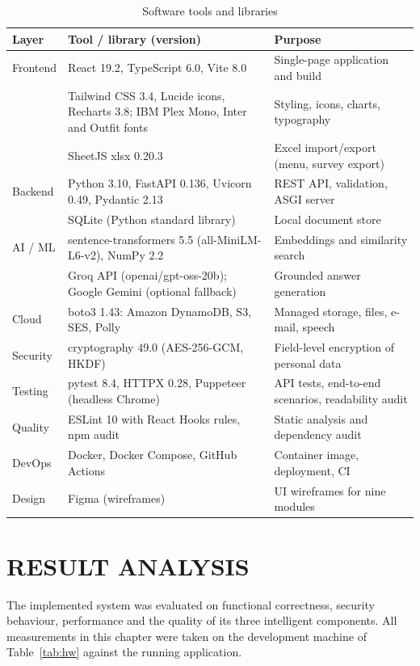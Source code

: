 \documentclass[12pt,a4paper,oneside]{report}
\newcommand{\head}{\rowcolor{headblue}}
\begin{document}
\begin{table}[!htbp]\centering\small
\caption{Software tools and libraries}\label{tab:sw}
\begin{tabularx}{\linewidth}{P{0.75in}LP{2.05in}}
\toprule\head \textbf{Layer} & \textbf{Tool / library (version)} & \textbf{Purpose}\\\midrule
Frontend & React 19.2, TypeScript 6.0, Vite 8.0 & Single-page application and build\\
  & Tailwind CSS 3.4, Lucide icons, Recharts 3.8; IBM Plex Mono, Inter and Outfit fonts & Styling, icons, charts, typography\\
 & SheetJS xlsx 0.20.3 & Excel import/export (menu, survey export)\\
Backend & Python 3.10, FastAPI 0.136, Uvicorn 0.49, Pydantic 2.13 & REST API, validation, ASGI server\\
 & SQLite (Python standard library) & Local document store\\
AI / ML & sentence-transformers 5.5 (all-MiniLM-L6-v2), NumPy 2.2 & Embeddings and similarity search\\
 & Groq API (openai/gpt-oss-20b); Google Gemini (optional fallback) & Grounded answer generation\\
Cloud & boto3 1.43: Amazon DynamoDB, S3, SES, Polly & Managed storage, files, e-mail, speech\\
Security & cryptography 49.0 (AES-256-GCM, HKDF) & Field-level encryption of personal data\\
Testing & pytest 8.4, HTTPX 0.28, Puppeteer (headless Chrome) & API tests, end-to-end scenarios, readability audit\\
Quality & ESLint 10 with React Hooks rules, npm audit & Static analysis and dependency audit\\
DevOps & Docker, Docker Compose, GitHub Actions & Container image, deployment, CI\\
Design & Figma (wireframes) & UI wireframes for nine modules\\
\bottomrule
\end{tabularx}
\end{table}

\chapter{RESULT ANALYSIS}
The implemented system was evaluated on functional correctness, security behaviour, performance and the quality of its
three intelligent components. All measurements in this chapter were taken on the development machine of
Table~\ref{tab:hw} against the running application.
\end{document}
